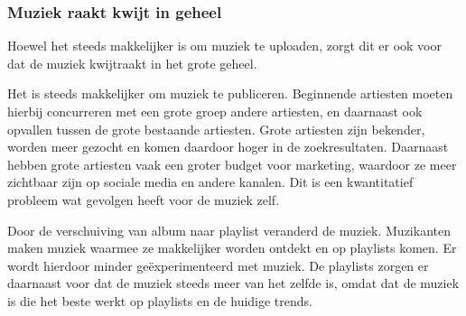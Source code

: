 \subsubsection*{Muziek raakt kwijt in geheel}
\begin{quotebox}
Hoewel het steeds makkelijker is om muziek te uploaden, zorgt dit er ook voor dat de muziek kwijtraakt in het grote geheel.
\end{quotebox}

Het is steeds makkelijker om muziek te publiceren. Beginnende artiesten moeten hierbij concurreren met een grote groep andere artiesten, en daarnaast ook opvallen tussen de grote bestaande artiesten. Grote artiesten zijn bekender, worden meer gezocht en komen daardoor hoger in de zoekresultaten. Daarnaast hebben grote artiesten vaak een groter budget voor marketing, waardoor ze meer zichtbaar zijn op sociale media en andere kanalen. Dit is een kwantitatief probleem wat gevolgen heeft voor de muziek zelf.

Door de verschuiving van album naar playlist veranderd de muziek. Muzikanten maken muziek waarmee ze makkelijker worden ontdekt en op playlists komen. Er wordt hierdoor minder geëxperimenteerd met muziek. De playlists zorgen er daarnaast voor dat de muziek steeds meer van het zelfde is, omdat dat de muziek is die het beste werkt op playlists en de huidige trends.

